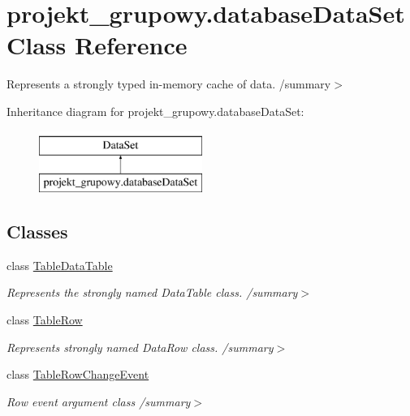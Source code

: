\hypertarget{classprojekt__grupowy_1_1database_data_set}{}\section{projekt\+\_\+grupowy.\+database\+Data\+Set Class Reference}
\label{classprojekt__grupowy_1_1database_data_set}


Represents a strongly typed in-\/memory cache of data. /summary$>$  


Inheritance diagram for projekt\+\_\+grupowy.\+database\+Data\+Set\+:\begin{figure}[H]
\begin{center}
\leavevmode
\includegraphics[height=2.000000cm]{classprojekt__grupowy_1_1database_data_set}
\end{center}
\end{figure}
\subsection*{Classes}
\begin{DoxyCompactItemize}
\item 
class \hyperlink{classprojekt__grupowy_1_1database_data_set_1_1_table_data_table}{Table\+Data\+Table}
\begin{DoxyCompactList}\small\item\em Represents the strongly named Data\+Table class. /summary$>$ \end{DoxyCompactList}\item 
class \hyperlink{classprojekt__grupowy_1_1database_data_set_1_1_table_row}{Table\+Row}
\begin{DoxyCompactList}\small\item\em Represents strongly named Data\+Row class. /summary$>$ \end{DoxyCompactList}\item 
class \hyperlink{classprojekt__grupowy_1_1database_data_set_1_1_table_row_change_event}{Table\+Row\+Change\+Event}
\begin{DoxyCompactList}\small\item\em Row event argument class /summary$>$ \end{DoxyCompactList}\end{DoxyCompactItemize}

